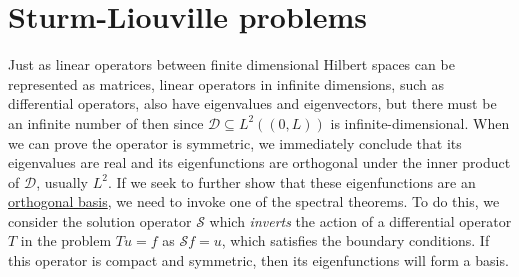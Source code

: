 \section{Sturm-Liouville problems}
Just as linear operators between finite dimensional Hilbert spaces can be represented as matrices, linear operators in infinite dimensions, such as differential operators, also have eigenvalues and eigenvectors, but there must be an infinite number of then since $\mathcal{D}\subseteq L^2((0,L))$ is infinite-dimensional. When we can prove the operator is symmetric, we immediately conclude that its eigenvalues are real and its eigenfunctions are orthogonal under the inner product of $\mathcal{D}$, usually $L^2$. If we seek to further show that these eigenfunctions are an \underline{orthogonal basis}, we need to invoke one of the spectral theorems. To do this, we consider the solution operator $\mathcal{S}$ which \textit{inverts} the action of a differential operator $T$ in the problem $Tu=f$ as $\mathcal{S}f = u$, which satisfies the boundary conditions. If this operator is compact and symmetric, then its eigenfunctions will form a basis. 

